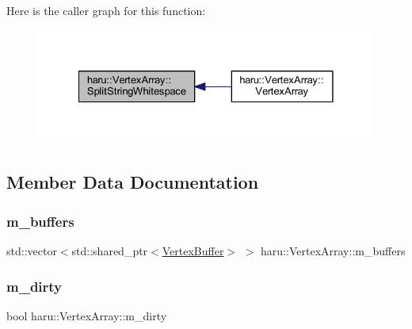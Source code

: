 Here is the caller graph for this function\+:
\nopagebreak
\begin{figure}[H]
\begin{center}
\leavevmode
\includegraphics[width=328pt]{classharu_1_1_vertex_array_a4881c24fdca7f802456d1b8823a0c4ce_icgraph}
\end{center}
\end{figure}


\subsection{Member Data Documentation}
\mbox{\label{classharu_1_1_vertex_array_a66f9492ccad01a67ed2dff56feefef46}} 
\subsubsection{\texorpdfstring{m\+\_\+buffers}{m\_buffers}}
{\footnotesize\ttfamily std\+::vector$<$std\+::shared\+\_\+ptr$<$\mbox{\hyperlink{classharu_1_1_vertex_buffer}{Vertex\+Buffer}}$>$ $>$ haru\+::\+Vertex\+Array\+::m\+\_\+buffers\hspace{0.3cm}{\ttfamily [private]}}

\mbox{\label{classharu_1_1_vertex_array_a7cc151adcf4133de6d7130e206e08b9d}} 
\subsubsection{\texorpdfstring{m\+\_\+dirty}{m\_dirty}}
{\footnotesize\ttfamily bool haru\+::\+Vertex\+Array\+::m\+\_\+dirty\hspace{0.3cm}{\ttfamily [private]}}

